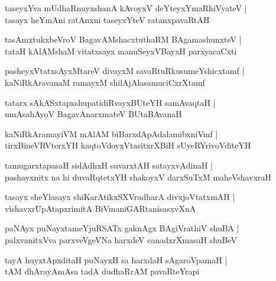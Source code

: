 \documentclass[twoside,12pt,openright]{book}
\newcounter{shloka}[chapter]
\begin{document}
\begin{shloka}
taseyxYva mUdhaRnuyxshanA kAvoyxV deYteyxYmaRhiVyateV |\\
tasayx heYmAni ratAnxni taseyxYteV ratanxpavaRtAH
\end{shloka}

\begin{shloka}
tasAmxtukxbeVroV BagavAMshacxtuthaRM BAgamashunxteV |\\
tataH kAlAMshaM vitatxsayx manuSeyxVBayxH parxyacaCxti
\end{shloka}

\begin{shloka}
pasheyxVtatxsAyxMtareV divayxM savaRtuRkusumeYshicxtamf |\\
kaNiRkAravanaM ramayxM shilAjAlasamuciCxrXtamf
\end{shloka}

\begin{shloka}
tatarx sAkASxtapxshupatidiRvayxBUteYH samAvaqtaH |\\
umAsahAyoV BagavAnarxmateV BUtaBAvanaH
\end{shloka}

\begin{shloka}
kaNiRkAramayiVM mAlAM biBarxdApAdalamibxniVmf |\\
tirxBineVRVterxYH kaqtoVdoyxVtasitxrXBiH sUyeRYrivoVditeYH
\end{shloka}

\begin{shloka}
tamugarxtapasaH sidAdhxH suvarxtAH satayxvAdinaH |\\
pashayxnitx na hi duvaRqtetxYH shakoyxV darxSuTxM maheVshavxraH
\end{shloka}

\begin{shloka}
tasayx sheYlasayx shiKarAtikxSXVradharA divxjoVtatxmAH |\\
vishavxrUpAtapxrimitA BiVmaniGARtanisasxvXnA
\end{shloka}

\begin{shloka}
paNAyx puNayxtameYjuRSATx gaknAgx BAgiVrathiV shuBA |\\
palxvanitxVva parxveVgeVNa harxdeV canadxrXmasaH shuBeV
\end{shloka}

\begin{shloka}
tayA huyxtApxditaH puNayxH sa harxdaH sAgaroVpamaH |\\
tAM dhArayAmAsa tadA dudhaRrAM pavaRteYrapi
\end{shloka}
\end{document}

